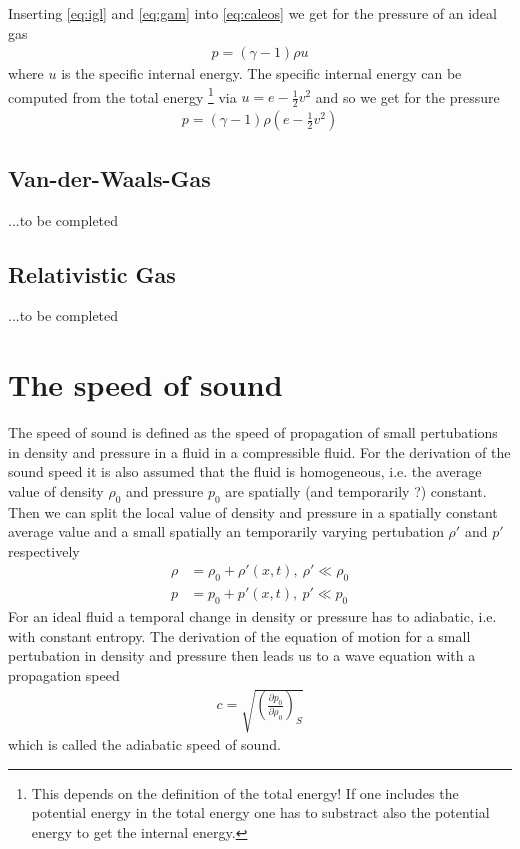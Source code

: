 \documentclass[a4paper,
					12pt,
					twoside,
					pagesize,
					cleardoubleplain,
					headsepline,
					bibtotoc
					]{scrbook}
\newcommand{\lra}[1]{{ \left( #1 \right) }}
\begin{document}
Inserting \eqref{eq:igl} and \eqref{eq:gam} into \eqref{eq:caleos} we get for
the pressure of an ideal gas
\begin{align}
p=(\gamma-1) \rho u \label{eq:igpress}
\end{align}
where $u$ is the specific internal energy. The specific internal energy can be
computed from the total energy \footnote{This depends
 on the definition of the total energy! If one includes the potential energy
in the total energy one has to substract also the potential energy to get the
internal energy.} via $u=e-\frac{1}{2}v^2$ and so we get for the
pressure
\begin{align}
p=\lra{\gamma-1} \rho \lra{e-\frac{1}{2}v^2}
\end{align}

\section{Van-der-Waals-Gas}

...to be completed

\section{Relativistic Gas}

...to be completed


\chapter{The speed of sound}
The speed of sound is defined as the speed of propagation of small pertubations
in density and pressure in a fluid in a compressible fluid. For the derivation
of the sound speed it is also assumed that the fluid is homogeneous, i.e. the
average value of density $\rho_0$ and pressure $p_0$ are spatially (and
temporarily ?) constant. Then we can split the local value of density and
pressure in a spatially constant average value and a small spatially an
temporarily varying pertubation $\rho'$ and $p'$ respectively
\begin{align}
\rho &= \rho_0 + \rho'(x,t),\ \rho' \ll \rho_0 \\
p &= p_0 + p'(x,t),\ p' \ll p_0
\end{align}
For an ideal fluid a temporal change in density or pressure has to adiabatic,
i.e. with constant entropy. The derivation of the equation of motion for a small
pertubation in density and pressure then leads us to a wave equation with a
propagation speed
\begin{align}
c=\sqrt{\lra{\frac{\partial p_0}{\partial \rho_0}}_S}
\end{align}
which is called the adiabatic speed of sound. 
\end{document}

